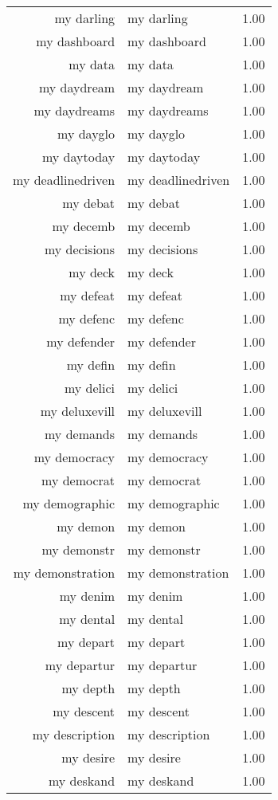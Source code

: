 \begin{table}[ht]
\begin{tabular}{rlr}
  my darling & my darling & 1.00 \\ 
  my dashboard & my dashboard & 1.00 \\ 
  my data & my data & 1.00 \\ 
  my daydream & my daydream & 1.00 \\ 
  my daydreams & my daydreams & 1.00 \\ 
  my dayglo & my dayglo & 1.00 \\ 
  my daytoday & my daytoday & 1.00 \\ 
  my deadlinedriven & my deadlinedriven & 1.00 \\ 
  my debat & my debat & 1.00 \\ 
  my decemb & my decemb & 1.00 \\ 
  my decisions & my decisions & 1.00 \\ 
  my deck & my deck & 1.00 \\ 
  my defeat & my defeat & 1.00 \\ 
  my defenc & my defenc & 1.00 \\ 
  my defender & my defender & 1.00 \\ 
  my defin & my defin & 1.00 \\ 
  my delici & my delici & 1.00 \\ 
  my deluxevill & my deluxevill & 1.00 \\ 
  my demands & my demands & 1.00 \\ 
  my democracy & my democracy & 1.00 \\ 
  my democrat & my democrat & 1.00 \\ 
  my demographic & my demographic & 1.00 \\ 
  my demon & my demon & 1.00 \\ 
  my demonstr & my demonstr & 1.00 \\ 
  my demonstration & my demonstration & 1.00 \\ 
  my denim & my denim & 1.00 \\ 
  my dental & my dental & 1.00 \\ 
  my depart & my depart & 1.00 \\ 
  my departur & my departur & 1.00 \\ 
  my depth & my depth & 1.00 \\ 
  my descent & my descent & 1.00 \\ 
  my description & my description & 1.00 \\ 
  my desire & my desire & 1.00 \\ 
  my deskand & my deskand & 1.00 \\ 

\end{tabular}
\end{table}
